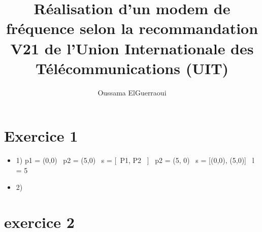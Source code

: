 \documentclass[frenchb]{article}
\begin{document}
\title{\vspace{4cm} {Réalisation d'un modem de fréquence selon la recommandation V21 de
l'Union Internationale des Télécommunications (UIT)}}
\author{ Oussama ElGuerraoui}
 


\section{Exercice 1}
\begin{itemize}
\item 1) p1 = (0,0) \
         p2 = (5,0) \
         s = [\ P1, P2 \ ] 
       \  p2 = (5, 0)
       \ s = [(0,0), (5,0)]
       \ l = 5
         
          
\item  2)  



  
     

\end{itemize}

\section{exercice 2}
\end{document}
